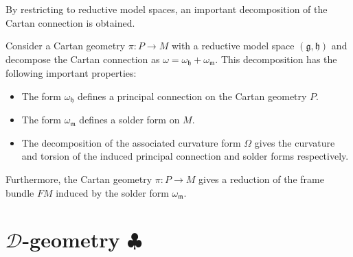     By restricting to reductive model spaces, an important decomposition of the Cartan connection is obtained.
    \begin{property}
        Consider a Cartan geometry $\pi:P\rightarrow M$ with a reductive model space $(\mathfrak{g},\mathfrak{h})$ and decompose the Cartan connection as $\omega=\omega_{\mathfrak{h}}+\omega_{\mathfrak{m}}$. This decomposition has the following important properties:
        \begin{itemize}
            \item The form $\omega_{\mathfrak{h}}$ defines a principal connection on the Cartan geometry $P$.
            \item The form $\omega_{\mathfrak{m}}$ defines a solder form on $M$.
            \item The decomposition of the associated curvature form $\Omega$ gives the curvature and torsion of the induced principal connection and solder forms respectively.
        \end{itemize}
        Furthermore, the Cartan geometry $\pi:P\rightarrow M$ gives a reduction of the frame bundle $FM$ induced by the solder form $\omega_{\mathfrak{m}}$.
    \end{property}

\section{\texorpdfstring{$\mathcal{D}$-geometry $\clubsuit$}{D-geometry}}



